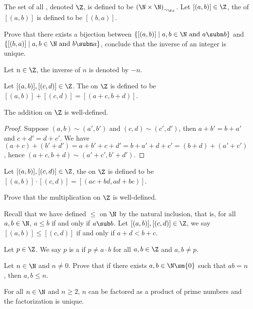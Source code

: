 \documentclass[10pt]{article}
\begin{document}
\begin{definition}
    The set of all , denoted $\Z$, is defined to be ${(\N\times{\N})}_{{\sim}_{\N+}}$. Let $[(a,b)]\in\Z$, the  of $[(a,b)]$ is defined to be $[(b,a)]$.
\end{definition}
\begin{problem}
    Prove that there exists a bijection between $\{[(a,b)]\mid a,b\in\N\ \text{and}\ a\subn b\}$ and $\{[(b,a)]\mid a,b\in\N\ \text{and}\ b\subn a\}$, conclude that the inverse of an integer is unique.
\end{problem}
\par
Let $n\in\Z$, the inverse of $n$ is denoted by $-n$.
\begin{definition}
    Let $[(a,b)],[(c,d)]\in\Z$. The  on $\Z$ is defined to be $[(a,b)]+[(c,d)]=[(a+c,b+d)]$.
\end{definition}
\begin{proposition}
    The addition on $\Z$ is well-defined.
\end{proposition}
\begin{proof}
    Suppose $(a,b)\sim(a',b')$ and $(c,d)\sim(c',d')$, then $a+b'=b+a'$ and $c+d'=d+c'$. We have $(a+c)+(b'+d')=a+b'+c+d'=b+a'+d+c'=(b+d)+(a'+c')$, hence $(a+c,b+d)\sim(a'+c',b'+d')$.
\end{proof}
\begin{definition}
    Let $[(a,b)],[(c,d)]\in\Z$, the  on $\Z$ is defined to be $[(a,b)]\cdot[(c,d)]=[(ac+bd,ad+bc)]$.
\end{definition}
\begin{problem}
    Prove that the multiplication on $\Z$ is well-defined.
\end{problem}
\par
Recall that we have defined $\le$ on $\N$ by the natural inclusion, that is, for all $a,b\in\N$, $a\le b$ if and only if $a\sub b$. Let $[(a,b)],[(c,d)]\in\Z$, we say $[(a,b)]\le[(c,d)]$ if and only if $a+d<b+c$.
\begin{definition}
    Let $p\in\Z$. We say $p$ is a  if $p\ne a\cdot b$ for all $a,b\in\Z$ and $a,b\ne p$.
\end{definition}
\begin{problem}
    Let $n\in\N$ and $n\ne 0$. Prove that if there exists $a,b\in\N\sm\{0\}$ such that $ab=n$, then $a,b\le n$.
\end{problem}
\begin{theorem}
    For all $n\in\N$ and $n\ge 2$, $n$ can be factored as a product of prime numbers and the factorization is unique.
\end{theorem}
\end{document}
